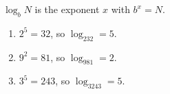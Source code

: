 $\log_b N$ is the exponent $x$ with $b^x=N$.
\begin{enumerate}
\item[(a)] $2^5=32$, so $\log_232=\boxed{5}$.
\item[(b)] $9^2=81$, so $\log_981=\boxed{2}$.
\item[(c)] $3^5=243$, so $\log_3243=\boxed{5}$.
\end{enumerate}
